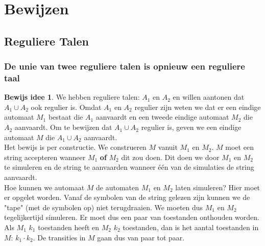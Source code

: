 \documentclass[12pt,a4paper]{article}
\theoremstyle{definition}
\newtheorem{bIdee}{Bewijs idee}[section]
\begin{document}
\section{Bewijzen}
\subsection{Reguliere Talen}
\subsubsection{De unie van twee reguliere talen is opnieuw een reguliere taal}
\begin{bIdee}
We hebben reguliere talen: $A_1$ en $A_2$ en willen aantonen dat $A_1 \cup A_2$ ook regulier is. Omdat $A_1$ en $A_2$ regulier zijn weten we dat er een eindige automaat $M_1$ bestaat die $A_1$ aanvaardt en een tweede eindige automaat $M_2$ die $A_2$ aanvaardt. Om te bewijzen dat $A_1 \cup A_2$ regulier is, geven we een eindige automaat $M$ die $A_1 \cup A_2$ aanvaardt.\\
Het bewijs is per constructie. We construeren $M$ vanuit $M_1$ en $M_2$. $M$ moet een string accepteren wanneer $M_1$ \textbf{of} $M_2$ dit zou doen. Dit doen we door $M_1$ en $M_2$ te simuleren en de string te aanvaarden wanneer één van de simulaties de string aanvaardt.\\
Hoe kunnen we automaat $M$ de automaten $M_1$ en $M_2$ laten simuleren? Hier moet er opgelet worden. Vanaf de symbolen van de string gelezen zijn kunnen we de "tape" (met de symbolen op) niet terugdraaien. We moeten dus $M_1$ en $M_2$ tegelijkertijd simuleren. Er moet dus een paar van toestanden onthouden worden. Als $M_1$ $k_1$ toestanden heeft en $M_2$ $k_2$ toestanden, dan is het aantal toestanden in $M$: $k_1 \cdot k_2$. De transities in $M$ gaan dus van paar tot paar. 
\end{bIdee}
\end{document}
